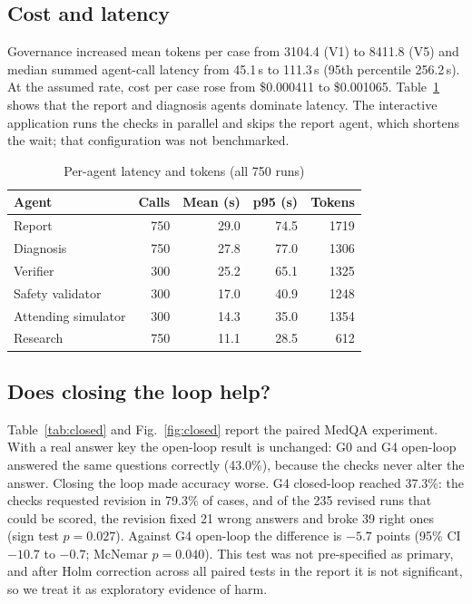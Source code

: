\documentclass[conference]{IEEEtran}
\begin{document}
\subsection{Cost and latency}
Governance increased mean tokens per case from 3104.4 (V1) to 8411.8 (V5) and median summed agent-call latency from
45.1\,s to 111.3\,s (95th percentile 256.2\,s). At the assumed rate, cost per case rose from \$0.000411 to \$0.001065.
Table~\ref{tab:latency} shows that the report and diagnosis agents dominate latency. The interactive application runs
the checks in parallel and skips the report agent, which shortens the wait; that configuration was not benchmarked.

\begin{table}[htbp]
\centering
\caption{Per-agent latency and tokens (all 750 runs)}
\label{tab:latency}
\begin{tabular}{lrrrr}
\toprule
\textbf{Agent} & \textbf{Calls} & \textbf{Mean (s)} & \textbf{p95 (s)} & \textbf{Tokens} \\
\midrule
Report & 750 & 29.0 & 74.5 & 1719 \\
Diagnosis & 750 & 27.8 & 77.0 & 1306 \\
Verifier & 300 & 25.2 & 65.1 & 1325 \\
Safety validator & 300 & 17.0 & 40.9 & 1248 \\
Attending simulator & 300 & 14.3 & 35.0 & 1354 \\
Research & 750 & 11.1 & 28.5 & 612 \\
\bottomrule
\end{tabular}
\end{table}

\subsection{Does closing the loop help?}
Table~\ref{tab:closed} and Fig.~\ref{fig:closed} report the paired MedQA experiment. With a real answer key the
open-loop result is unchanged: G0 and G4 open-loop answered the same questions correctly (43.0\%), because the
checks never alter the answer. Closing the loop made accuracy worse. G4 closed-loop reached 37.3\%: the checks
requested revision in 79.3\% of cases, and of the 235 revised runs that could be scored, the revision fixed 21 wrong
answers and broke 39 right ones (sign test $p = 0.027$). Against G4 open-loop the difference is $-5.7$ points (95\% CI
$-10.7$ to $-0.7$; McNemar $p = 0.040$). This test was not pre-specified as primary, and after Holm correction across
all paired tests in the report it is not significant, so we treat it as exploratory evidence of harm.
\end{document}
